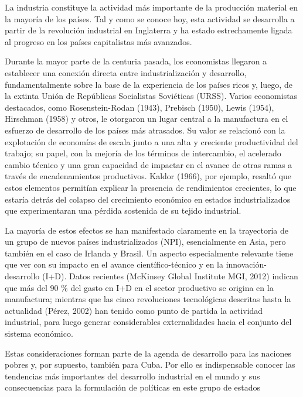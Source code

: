     La industria constituye la actividad más importante de la producción material en la mayoría de los países. Tal y como se conoce hoy, esta actividad se desarrolla a partir de la revolución industrial en Inglaterra y ha estado estrechamente ligada al progreso en los países capitalistas más avanzados.
    
    Durante la mayor parte de la centuria pasada, los economistas llegaron a establecer una conexión directa entre industrialización y desarrollo, fundamentalmente sobre la base de la experiencia de los países ricos y, luego, de la extinta Unión de Repúblicas Socialistas Soviéticas (URSS). Varios economistas destacados, como Rosenstein-Rodan (1943), Prebisch (1950), Lewis (1954), Hirschman (1958) y otros, le otorgaron un lugar central a la manufactura en el esfuerzo de desarrollo de los países más atrasados. Su valor se relacionó con la explotación de economías de escala junto a una alta y creciente productividad del trabajo; su papel, con la mejoría de los términos de intercambio, el acelerado cambio técnico y una gran capacidad de impactar en el avance de otras ramas a través de encadenamientos productivos. Kaldor (1966), por ejemplo, resaltó que estos elementos permitían explicar la presencia de rendimientos crecientes, lo que estaría detrás del colapso del crecimiento económico en estados industrializados que experimentaran una pérdida sostenida de su tejido industrial. 
    
    
    
    La mayoría de estos efectos se han manifestado claramente en la trayectoria de un grupo de nuevos países industrializados (NPI), esencialmente en Asia, pero también en el caso de Irlanda y Brasil. Un aspecto especialmente relevante tiene que ver con su impacto en el avance científico-técnico y en la innovación-desarrollo (I+D). Datos recientes (McKinsey Global Institute MGI, 2012) indican que más del 90 \% del gasto en I+D en el sector productivo se origina en la manufactura; mientras que las cinco revoluciones tecnológicas descritas hasta la actualidad (Pérez, 2002) han tenido como punto de partida la actividad industrial, para luego generar considerables externalidades hacia el conjunto del sistema económico.
    
    Estas consideraciones forman parte de la agenda de desarrollo para las naciones pobres y, por supuesto, también para Cuba. Por ello es indispensable conocer las tendencias más importantes del desarrollo industrial en el mundo y sus consecuencias para la formulación de políticas en este grupo de estados
    
